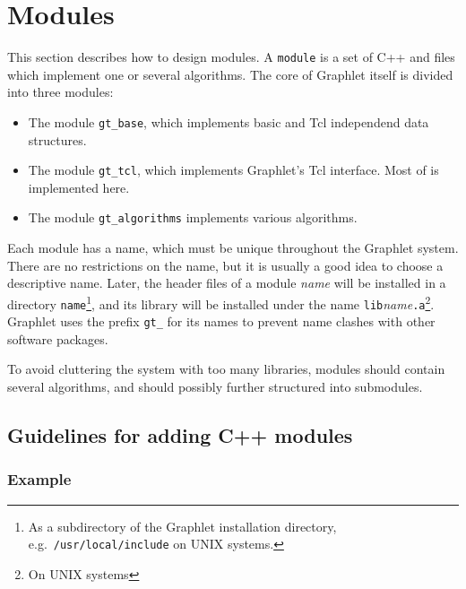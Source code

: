 \documentclass[twoside,fleqn]{report}
\begin{document}
%
%

\chapter{Modules}
\label{c:Modules}

This section describes how to design \Graphlet{} modules.  A
\texttt{module} is a set of C++ and \GraphScript{} files which
implement one or several algorithms. The core of Graphlet itself is 
divided into three modules:

\begin{itemize}
        \item  The module \texttt{gt\_base}, which implements basic and Tcl 
        independend data structures.

        \item  The module \texttt{gt\_tcl}, which implements Graphlet's Tcl 
        interface. Most of \GraphScript{} is implemented here.

        \item  The module \texttt{gt\_algorithms} implements various algorithms.
        
\end{itemize}

Each module has a name, which must be unique throughout the Graphlet 
system.  There are no restrictions on the name, but it is usually a 
good idea to choose a descriptive name.  Later, the header files of a 
module \emph{name} will be installed in a directory 
\texttt{name}\footnote{As a subdirectory of the Graphlet installation 
directory, e.g.\ \texttt{/usr/local/include} on UNIX systems.}, and 
its library will be installed under the name 
\texttt{lib}\emph{name}\texttt{.a}\footnote{On UNIX systems}.  
Graphlet uses the prefix \texttt{gt\_} for its names to prevent name 
clashes with other software packages.

To avoid cluttering the system with too many libraries, modules should 
contain several algorithms, and should possibly further structured 
into submodules.

%
%

\section{Guidelines for adding C++ modules}

\subsection{Example}
\end{document}
